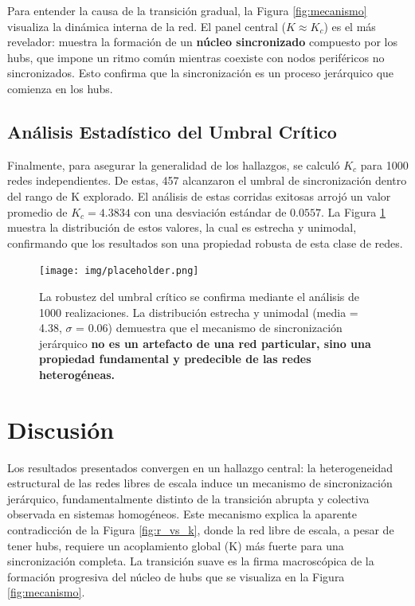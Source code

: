 \documentclass[12pt, a4paper]{article}
\begin{document}
Para entender la causa de la transición gradual, la Figura \ref{fig:mecanismo} visualiza la dinámica interna de la red. El panel central (\(K \approx K_c\)) es el más revelador: muestra la formación de un \textbf{núcleo sincronizado} compuesto por los hubs, que impone un ritmo común mientras coexiste con nodos periféricos no sincronizados. Esto confirma que la sincronización es un proceso jerárquico que comienza en los hubs.

\subsection{Análisis Estadístico del Umbral Crítico}
Finalmente, para asegurar la generalidad de los hallazgos, se calculó \(K_c\) para 1000 redes independientes. De estas, 457 alcanzaron el umbral de sincronización dentro del rango de K explorado. El análisis de estas corridas exitosas arrojó un valor promedio de \(K_c = 4.3834\) con una desviación estándar de \(0.0557\). La Figura \ref{fig:kc_hist} muestra la distribución de estos valores, la cual es estrecha y unimodal, confirmando que los resultados son una propiedad robusta de esta clase de redes.

\begin{figure}[H]
    \centering
    \texttt{[image: img/placeholder.png]} 
    \caption{La robustez del umbral crítico se confirma mediante el análisis de 1000 realizaciones. La distribución estrecha y unimodal (media = 4.38, \(\sigma\) = 0.06) demuestra que el mecanismo de sincronización jerárquico \textbf{no es un artefacto de una red particular, sino una propiedad fundamental y predecible de las redes heterogéneas.}}
    \label{fig:kc_hist}
\end{figure}


\section{Discusión}

Los resultados presentados convergen en un hallazgo central: la heterogeneidad estructural de las redes libres de escala induce un mecanismo de sincronización jerárquico, fundamentalmente distinto de la transición abrupta y colectiva observada en sistemas homogéneos. Este mecanismo explica la aparente contradicción de la Figura \ref{fig:r_vs_k}, donde la red libre de escala, a pesar de tener hubs, requiere un acoplamiento global (K) más fuerte para una sincronización completa. La transición suave es la firma macroscópica de la formación progresiva del núcleo de hubs que se visualiza en la Figura \ref{fig:mecanismo}.
\end{document}
